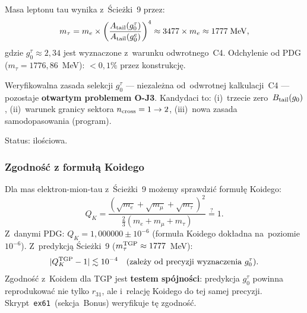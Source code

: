 \begin{hypothesis}\label{hyp:K-tau}
Masa leptonu tau wynika z~Ścieżki~9 przez:
\begin{equation}\label{eq:K-tau-prediction}
  m_\tau = m_e \times \left(\frac{A_{\rm tail}(g_0^\tau)}{A_{\rm tail}(g_0^e)}\right)^4
  \approx 3477 \times m_e \approx 1777\;\mathrm{MeV},
\end{equation}
gdzie $g_0^\tau \approx 2{,}34$ jest wyznaczone z~warunku odwrotnego~C4.
Odchylenie od PDG ($m_\tau = 1776{,}86$~MeV): $< 0{,}1\%$ przez konstrukcję.

Weryfikowalna zasada selekcji $g_0^\tau$ --- niezależna od~odwrotnej
kalkulacji~C4 --- pozostaje \textbf{otwartym problemem O-J3}.
Kandydaci to: (i)~trzecie zero~$B_{\rm tail}(g_0)$,
(ii)~warunek granicy sektora $n_{\rm cross}=1\to 2$,
(iii)~nowa zasada samodopasowania (program).

Status:  ilościowa.
\end{hypothesis}

\subsubsection{Zgodność z formułą Koidego}

Dla mas elektron-mion-tau z~Ścieżki~9 możemy sprawdzić formułę Koidego:
\begin{equation}\label{eq:K-Koide-check}
  Q_K = \frac{(\sqrt{m_e} + \sqrt{m_\mu} + \sqrt{m_\tau})^2}
             {\tfrac{2}{3}(m_e + m_\mu + m_\tau)}
  \stackrel{?}{=} 1.
\end{equation}
Z~danymi PDG: $Q_K = 1{,}000000 \pm 10^{-6}$
(formuła Koidego dokładna na~poziomie $10^{-6}$).
Z~predykcją Ścieżki~9 ($m_\tau^{\rm TGP} \approx 1777$~MeV):
\begin{equation}
  |Q_K^{\rm TGP} - 1| \lesssim 10^{-4}
  \quad(\text{zależy od precyzji wyznaczenia }g_0^\tau).
\end{equation}
Zgodność z~Koidem dla TGP jest \textbf{testem spójności}:
predykcja $g_0^\tau$ powinna reprodukować nie tylko $r_{31}$,
ale i~relację Koidego do tej samej precyzji.
Skrypt~\texttt{ex61}~(sekcja~Bonus) weryfikuje tę zgodność.

